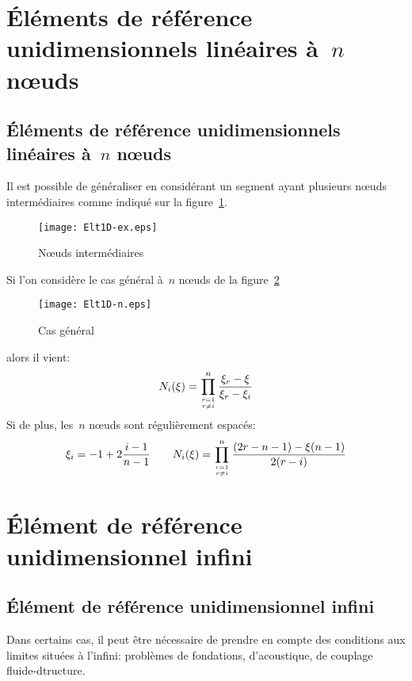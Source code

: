 \medskipvm
\ifVersionAvecExemplesSepares
  \section{Éléments de référence unidimensionnels linéaires à~$n$ nœuds}
\else
  \subsection{Éléments de référence unidimensionnels linéaires à~$n$ nœuds}
\fi

Il est possible de généraliser en considérant un segment ayant plusieurs nœuds 
intermédiaires comme indiqué sur la figure~\ref{fig:ex2:noeudint}.
\begin{figure}[ht]\centering
\texttt{[image: Elt1D-ex.eps]}
\caption{Nœuds intermédiaires}\label{fig:ex2:noeudint}
\end{figure}
\medskipvm
Si l'on considère le cas général à~$n$ nœuds de la figure~\ref{fig:ex2:casgen}
\begin{figure}[ht]\centering
\texttt{[image: Elt1D-n.eps]}
\caption{Cas général}\label{fig:ex2:casgen}
\end{figure}
alors il vient:
\begin{equation} N_i(\xi) = \prod_{r=1\atop r\ne i}^n \dfrac{\xi_r-\xi}{\xi_r-\xi_i} \end{equation}
\medskipvm
Si de plus, les~$n$ nœuds sont régulièrement espacés:
\begin{equation}\xi_i = -1+2\frac{i-1}{n-1} \qquad
N_i(\xi) = \prod_{r=1\atop r\ne i}^n \dfrac{(2r-n-1)-\xi(n-1)}{2(r-i)} \end{equation}
\medskipvm
\ifVersionAvecExemplesSepares
  \section{Élément de référence unidimensionnel infini}
\else
  \subsection{Élément de référence unidimensionnel infini}
\fi
Dans certains cas, il peut être nécessaire de prendre en compte des conditions aux limites situées à
l'infini: problèmes de fondations, d'acoustique, de couplage fluide-dtructure.

